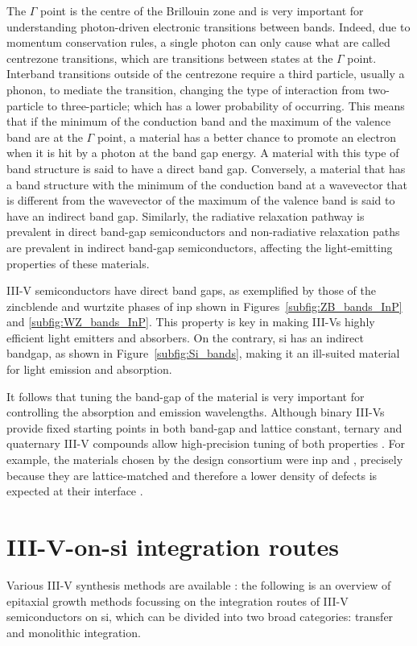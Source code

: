 The $\Gamma$ point is the centre of the Brillouin zone and is very important for understanding photon-driven electronic transitions between bands. Indeed, due to momentum conservation rules, a single photon can only cause what are called centrezone transitions, which are transitions between states at the $\Gamma$ point. Interband transitions outside of the centrezone require a third particle, usually a phonon, to mediate the transition, changing the type of interaction from two-particle to three-particle; which has a lower probability of occurring. This means that if the minimum of the conduction band and the maximum of the valence band are at the $\Gamma$ point, a material has a better chance to promote an electron when it is hit by a photon at the band gap energy. A material with this type of band structure is said to have a direct band gap. Conversely, a material that has a band structure with the minimum of the conduction band at a wavevector that is different from the wavevector of the maximum of the valence band is said to have an indirect band gap. Similarly, the radiative relaxation pathway is prevalent in direct band-gap semiconductors and non-radiative relaxation paths are prevalent in indirect band-gap semiconductors, affecting the light-emitting properties of these materials.

III-V semiconductors have direct band gaps, as exemplified by those of the zincblende and wurtzite phases of  \acl{inp} shown in Figures~\ref{subfig:ZB_bands_InP} and \ref{subfig:WZ_bands_InP}. This property is key in making III-Vs highly efficient light emitters and absorbers. On the contrary, \acl{si} has an indirect bandgap, as shown in Figure~\ref{subfig:Si_bands}, making it an ill-suited material for light emission and absorption.

It follows that tuning the band-gap of the material is very important for controlling the absorption and emission wavelengths. Although binary III-Vs provide fixed starting points in both band-gap and lattice constant, ternary and quaternary III-V compounds allow high-precision tuning of both properties \cite{Ning2017}. For example, the materials chosen by the \acs{design} consortium were \acs{inp} and , precisely because they are lattice-matched and therefore a lower density of defects is expected at their interface \cite{Pearsall1980, Sugii1983, Wagner1970}.

\section{\texorpdfstring{III-V-on-\acs{si} integration routes}{III-V-on-Si integration routes}}
Various III-V synthesis methods are available \cite{Kuech2016}: the following is an overview of epitaxial growth methods focussing on the integration routes of III-V semiconductors on \acl{si}, which can be divided into two broad categories: transfer and monolithic integration.

